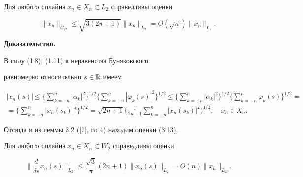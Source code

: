 \begin{lem}


Для любого сплайна $x_n \in X_n \subset L_2$ справедливы оценки


\begin{equation}


\|x_n\|_{C_{2\pi}}\le \sqrt{3(2n+1)}\|x_n\|_{L_2}=O(\sqrt{n})\|x_n\|_{L_2}.


\end{equation}


\end{lem}





{\bf Доказательство.}


В силу (1.8), (1.11) и неравенства Буняковского 


равномерно относительно $s \in \Bbb R$ имеем


\begin{multline*}


|x_n (s)|\le \bigg\{\sum_{k=-n}^{n}|\alpha_k|^2


\bigg\}^{1/2}\bigg\{\sum_{k=-n}^{n}|\varphi_k (s)|^2


\bigg\}^{1/2} \le


\bigg\{ \sum_{k=-n}^{n}|\alpha_{k}|^2


\bigg\}^{1/2}\bigg\{\sum_{k=-n}^{n} \varphi_{k}(s)


\bigg\}^{1/2}= \\


%


=\bigg\{\sum_{k=-n}^{n}|x_{n}(s_k)|^2 \bigg\}^{1/2}=


\sqrt{2n+1} \bigg\{\frac{1}{2n+1}\sum_{k=-n}^{n}|x_n (s_k)|^2


\bigg\}^{1/2}, \quad x_n \in X_n.


\end{multline*}


Отсюда и из леммы 3.2 ([7], гл.\,4) находим оценки (3.13).





\begin{lem}


Для любого сплайна $x_n \in X_n \subset W_{2}^{1}$ справедливы оценки


\begin{equation}


\bigg\|\frac{d}{ds}x_{n}(s)\bigg\|_{L_2}\le \frac{\sqrt{3}}{\pi} (2n+1)\|x_n


(s)\|_{L_2}=O(n)\|x_n\|_{L_2}.


\end{equation}


\end{lem}





